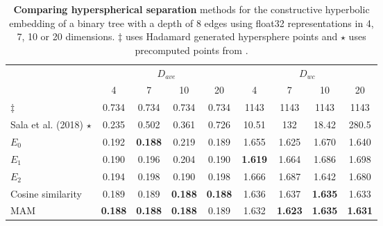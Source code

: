 \begin{table}[h]
    \centering
    \begin{tabular}{l @{\hskip 0.5cm} cccc @{\hskip 0.5cm} cccc}
        \toprule
        & \multicolumn{4}{c}{\hspace{-0.7cm} $D_{ave}$} & \multicolumn{4}{c}{\hspace{-0.7cm} $D_{wc}$} \\
        & 4 & 7 & 10 & 20 & 4 & 7 & 10 & 20 \\
        \midrule
        \cite{sala2018representation} $\ddagger$ & 0.734 & 0.734 & 0.734 & 0.734 & 1143 & 1143 & 1143 & 1143 \\
        Sala et al. (2018) $\star$ & 0.235 & 0.502 & 0.361 & 0.726 & 10.51 & 132 & 18.42 & 280.5 \\ 
        $E_0$ & 0.192 & \textbf{0.188} & 0.219 & 0.189 & 1.655 & 1.625 & 1.670 & 1.640 \\
        $E_1$ & 0.190 & 0.196 & 0.204 & 0.190 & \textbf{1.619} & 1.664 & 1.686 & 1.698 \\
        $E_2$ & 0.194 & 0.198 & 0.190 & 0.198 & 1.666 & 1.687 & 1.642 & 1.680 \\
        Cosine similarity & 0.189 & 0.189 & \textbf{0.188} & \textbf{0.188} & 1.636 & 1.637 & \textbf{1.635} & 1.633 \\
        \rowcolor{Gray}
        MAM & \textbf{0.188} & \textbf{0.188} & \textbf{0.188} & 0.189 & 1.632 & \textbf{1.623} & \textbf{1.635} & \textbf{1.631} \\
        \bottomrule
    \end{tabular}
    \caption{\textbf{Comparing hyperspherical separation} methods for the constructive hyperbolic embedding of a binary tree with a depth of 8 edges using float32 representations in 4, 7, 10 or 20 dimensions. $\ddagger$ uses Hadamard generated hypersphere points and $\star$ uses precomputed points from \citep{lovisolo2001uniform}. }
    \label{tab:bin_tree_dim_res}
\end{table}